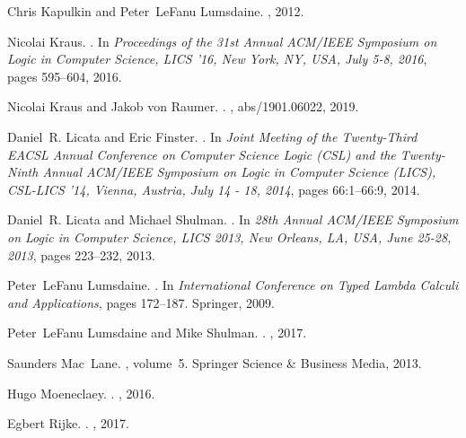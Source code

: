\documentclass[9pt]{entcs}
\newcommand{\0}{\textbf{0}} %
\begin{document}
\begin{thebibliography}{10}
	Chris Kapulkin and Peter~LeFanu Lumsdaine.
	,
	2012.
	
	Nicolai Kraus.
	.
	\newblock In {\em Proceedings of the 31st Annual {ACM/IEEE} Symposium on Logic
		in Computer Science, {LICS} '16, New York, NY, USA, July 5-8, 2016}, pages
	595--604, 2016.
	
	Nicolai Kraus and Jakob von Raumer.
	.
	, abs/1901.06022, 2019.
	
	Daniel~R. Licata and Eric Finster.
	.
	\newblock In {\em Joint Meeting of the Twenty-Third {EACSL} Annual Conference
		on Computer Science Logic {(CSL)} and the Twenty-Ninth Annual {ACM/IEEE}
		Symposium on Logic in Computer Science (LICS), {CSL-LICS} '14, Vienna,
		Austria, July 14 - 18, 2014}, pages 66:1--66:9, 2014.
	
	Daniel~R. Licata and Michael Shulman.
	.
	\newblock In {\em 28th Annual {ACM/IEEE} Symposium on Logic in Computer
		Science, {LICS} 2013, New Orleans, LA, USA, June 25-28, 2013}, pages
	223--232, 2013.
	
	Peter~LeFanu Lumsdaine.
	.
	\newblock In {\em International Conference on Typed Lambda Calculi and
		Applications}, pages 172--187. Springer, 2009.
	
	Peter~LeFanu Lumsdaine and Mike Shulman.
	.
	, 2017.
	
	Saunders Mac~Lane.
	, volume~5.
	\newblock Springer Science \& Business Media, 2013.
	
	Hugo Moeneclaey.
	.
	, 2016.
	
	Egbert Rijke.
	.
	, 2017.
	

\end{thebibliography}
\end{document}
